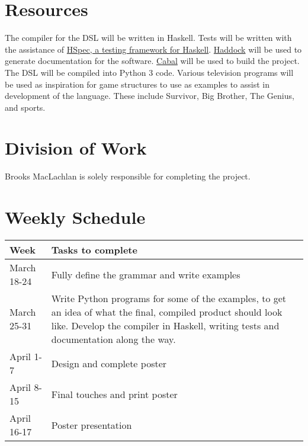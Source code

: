 \documentclass[12pt]{article}
\begin{document}
	\section{Resources}
	
	The compiler for the DSL will be written in Haskell. Tests will be written 
	with the assistance of \href{https://hspec.github.io/}{HSpec, a testing 
	framework for Haskell}. \href{https://www.haskell.org/haddock/}{Haddock} 
	will be used to generate documentation for the software. 
	\href{https://www.haskell.org/cabal/}{Cabal} will be used to build the 
	project. The DSL will be 
	compiled into Python 3 code. Various television programs will be used as 
	inspiration for game structures to use as examples to assist in development 
	of the language. These include Survivor, Big Brother, The Genius, and 
	sports.
	
	\section{Division of Work}
	
	Brooks MacLachlan is solely responsible for completing the project.
	
	\section{Weekly Schedule}
	
	\begin{tabular}{l p{13cm}}
		\toprule
		Week & Tasks to complete\\
		\midrule
		March 18-24 & Fully define the grammar and write examples\\
		March 25-31 & Write Python programs for some 
		of the examples, to get an idea of what the final, compiled product 
		should look like. Develop the compiler in Haskell, writing tests and 
		documentation along the way.\\
		April 1-7 & Design and complete poster\\
		April 8-15 & Final touches and print poster\\
		April 16-17 & Poster presentation\\
		\bottomrule
	\end{tabular}
	
\end{document}
